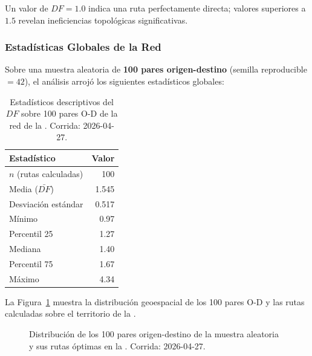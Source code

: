 Un valor de $DF = 1.0$ indica una ruta perfectamente directa; valores superiores
a $1.5$ revelan ineficiencias topológicas significativas.

\subsubsection{Estadísticas Globales de la Red}
\label{subsubsec:df-estadisticas}

Sobre una muestra aleatoria de \textbf{100 pares origen-destino} (semilla
reproducible $= 42$), el análisis arrojó los siguientes estadísticos globales:

\begin{table}[H]
    \centering
    \caption[Estadísticos globales del Factor de Desviación — muestra de 100 rutas]{
    Estadísticos descriptivos del $DF$ sobre 100 pares O-D de la red de la \zmvm.
    Corrida: 2026-04-27.}
    \label{tab:df-estadisticas}
    \begin{tabular}{|l|r|}
        \hline
        \textbf{Estadístico} & \textbf{Valor} \\
        \hline
        $n$ (rutas calculadas)     & 100   \\
        Media ($\bar{DF}$)         & 1.545 \\
        Desviación estándar        & 0.517 \\
        Mínimo                     & 0.97  \\
        Percentil 25               & 1.27  \\
        Mediana                    & 1.40  \\
        Percentil 75               & 1.67  \\
        Máximo                     & 4.34  \\
        \hline
    \end{tabular}
\end{table}

La Figura~\ref{fig:df-caso-inicial} muestra la distribución geoespacial de los
100 pares O-D y las rutas calculadas sobre el territorio de la \zmvm{}.

\begin{figure}[H]
    \centering
    \caption[Distribución de la muestra O-D para el Factor de Desviación]{
    Distribución de los 100 pares origen-destino de la muestra aleatoria y sus
    rutas óptimas en la \zmvm. Corrida: 2026-04-27.}
    \label{fig:df-caso-inicial}
\end{figure}

